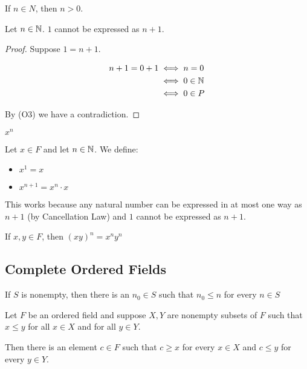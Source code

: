\begin{prop}
	If $n \in N$, then $n>0$.
\end{prop}

\begin{prop}
	Let $n \in \mathbb{N}$. $1$ cannot be expressed as $n+1$.

	\begin{proof}
		Suppose $1 = n+1$. 

		\begin{align*}
			n+1 = 0 + 1 &\iff n=0 \\
						&\iff 0 \in \mathbb{N} \\
						&\iff 0 \in P
		\end{align*}

		By (O3) we have a contradiction.
	\end{proof}
\end{prop}

\begin{definition}
	$x^n$

	Let $x \in F$ and let $n \in \mathbb{N}$. We define:

	\begin{itemize}
		\item $x^1 = x$
		\item $x^{n+1} = x^n \cdot x$
	\end{itemize}

	This works because any natural number can be expressed in at most one way 
	as $n+1$ (by Cancellation Law) and $1$ cannot be expressed as $n+1$.
\end{definition}

\begin{prop}
	If $x,y \in F$, then $(xy)^n = x^n y^n$
\end{prop}


\subsection{Complete Ordered Fields}

\begin{prop}
	If $S$ is nonempty, then there is an $n_0 \in S$ such that $n_0 \leq n$
	for every $n \in S$
\end{prop}

\begin{prop}
	Let $F$ be an ordered field and suppose $X, Y$ are nonempty subsets of $F$
	such that $x \leq y$ for all $x \in X$ and for all $y \in Y$. 

	Then there is an element $c \in F$ such that $c \geq x$ for every $x \in X$ 
	and $c \leq y$ for every $y \in Y$.
\end{prop}


